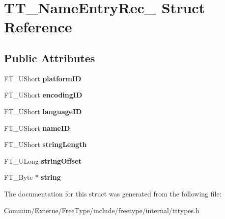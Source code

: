 \hypertarget{struct_t_t___name_entry_rec__}{}\section{T\+T\+\_\+\+Name\+Entry\+Rec\+\_\+ Struct Reference}
\label{struct_t_t___name_entry_rec__}
\subsection*{Public Attributes}
\begin{DoxyCompactItemize}
\item 
F\+T\+\_\+\+U\+Short {\bfseries platform\+ID}\hypertarget{struct_t_t___name_entry_rec___a9d4ee8bc42ed087f4533b6f664c0f6c6}{}\label{struct_t_t___name_entry_rec___a9d4ee8bc42ed087f4533b6f664c0f6c6}

\item 
F\+T\+\_\+\+U\+Short {\bfseries encoding\+ID}\hypertarget{struct_t_t___name_entry_rec___a8e7403a2f37c7f7fdb3c19e9549d315c}{}\label{struct_t_t___name_entry_rec___a8e7403a2f37c7f7fdb3c19e9549d315c}

\item 
F\+T\+\_\+\+U\+Short {\bfseries language\+ID}\hypertarget{struct_t_t___name_entry_rec___a2ec03c0ff0c542f403b45a515bb20afb}{}\label{struct_t_t___name_entry_rec___a2ec03c0ff0c542f403b45a515bb20afb}

\item 
F\+T\+\_\+\+U\+Short {\bfseries name\+ID}\hypertarget{struct_t_t___name_entry_rec___abdaaec01d6620b3801f233cde5964548}{}\label{struct_t_t___name_entry_rec___abdaaec01d6620b3801f233cde5964548}

\item 
F\+T\+\_\+\+U\+Short {\bfseries string\+Length}\hypertarget{struct_t_t___name_entry_rec___a736e5f8caeada86cc33f62acca6537f5}{}\label{struct_t_t___name_entry_rec___a736e5f8caeada86cc33f62acca6537f5}

\item 
F\+T\+\_\+\+U\+Long {\bfseries string\+Offset}\hypertarget{struct_t_t___name_entry_rec___a33ed41d4d3c4fffa74193f3b52e11870}{}\label{struct_t_t___name_entry_rec___a33ed41d4d3c4fffa74193f3b52e11870}

\item 
F\+T\+\_\+\+Byte $\ast$ {\bfseries string}\hypertarget{struct_t_t___name_entry_rec___aefa752d5c88149f8e64122e14855d831}{}\label{struct_t_t___name_entry_rec___aefa752d5c88149f8e64122e14855d831}

\end{DoxyCompactItemize}


The documentation for this struct was generated from the following file\+:\begin{DoxyCompactItemize}
\item 
Commun/\+Externe/\+Free\+Type/include/freetype/internal/tttypes.\+h\end{DoxyCompactItemize}
